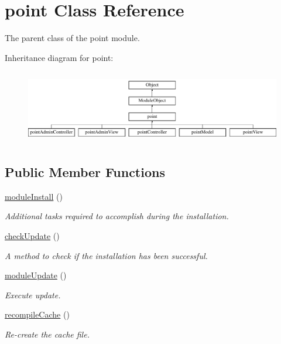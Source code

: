 \hypertarget{classpoint}{}\section{point Class Reference}
\label{classpoint}


The parent class of the point module.  


Inheritance diagram for point\+:\begin{figure}[H]
\begin{center}
\leavevmode
\includegraphics[height=3.246377cm]{classpoint}
\end{center}
\end{figure}
\subsection*{Public Member Functions}
\begin{DoxyCompactItemize}
\item 
\hyperlink{classpoint_a6f542fa43f0fc00f21eaf36fa0c3f9c0}{module\+Install} ()
\begin{DoxyCompactList}\small\item\em Additional tasks required to accomplish during the installation. \end{DoxyCompactList}\item 
\hyperlink{classpoint_a26afa184808e8535aec718cebd34c908}{check\+Update} ()
\begin{DoxyCompactList}\small\item\em A method to check if the installation has been successful. \end{DoxyCompactList}\item 
\hyperlink{classpoint_a7741cbf1209b73247026a7178cfc83fe}{module\+Update} ()
\begin{DoxyCompactList}\small\item\em Execute update. \end{DoxyCompactList}\item 
\hyperlink{classpoint_a7019f188fb82f17f8d31cd6532aa8814}{recompile\+Cache} ()
\begin{DoxyCompactList}\small\item\em Re-\/create the cache file. \end{DoxyCompactList}\end{DoxyCompactItemize}
